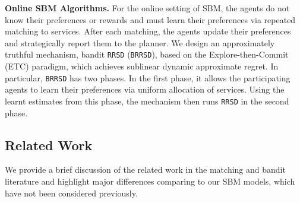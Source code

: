 \documentclass[letterpaper,11pt]{article}
\newcommand{\kibitz}[2]{\ifnum\Comments=1{\color{#1}{#2}}\fi}
\newcommand{\hau}[1]{\kibitz{blue}{[Hau: #1]}}
\begin{document}

\textbf{Online SBM Algorithms.} 
For the online setting of SBM, the agents do not know their  preferences or rewards  
and must learn their preferences via repeated matching to services. After each matching, the agents update their preferences and strategically report them to the planner.  
We design an approximately truthful mechanism, bandit \texttt{RRSD} (\texttt{BRRSD}), based on the Explore-then-Commit (ETC) paradigm, which achieves sublinear dynamic approximate regret.
In particular, \texttt{BRRSD} has two phases. In the first phase, it allows the participating agents to learn their preferences via uniform allocation of services. Using the learnt estimates from this phase, the mechanism then runs \texttt{RRSD} in the second phase.  


\subsection{Related Work}
We provide a brief discussion of the related work in the matching and bandit literature  
and highlight major differences comparing to our SBM models, which have not been considered previously. 





\end{document}
